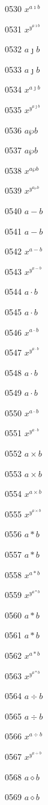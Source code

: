 \documentclass{article}
\begin{document}
0530 $x^{a\imath b}$\par
0531 $x^{y^{a\imath b}}$\par
0532 $a\jmath b$\par
0533 $\displaystyle a\jmath b$\par
0534 $x^{a\jmath b}$\par
0535 $x^{y^{a\jmath b}}$\par
0536 $a\wp b$\par
0537 $\displaystyle a\wp b$\par
0538 $x^{a\wp b}$\par
0539 $x^{y^{a\wp b}}$\par
0540 $a-b$\par
0541 $\displaystyle a-b$\par
0542 $x^{a-b}$\par
0543 $x^{y^{a-b}}$\par
0544 $a\cdot b$\par
0545 $\displaystyle a\cdot b$\par
0546 $x^{a\cdot b}$\par
0547 $x^{y^{a\cdot b}}$\par
0548 $a\cdotp b$\par
0549 $\displaystyle a\cdotp b$\par
0550 $x^{a\cdotp b}$\par
0551 $x^{y^{a\cdotp b}}$\par
0552 $a\times b$\par
0553 $\displaystyle a\times b$\par
0554 $x^{a\times b}$\par
0555 $x^{y^{a\times b}}$\par
0556 $a*b$\par
0557 $\displaystyle a*b$\par
0558 $x^{a*b}$\par
0559 $x^{y^{a*b}}$\par
0560 $a\ast b$\par
0561 $\displaystyle a\ast b$\par
0562 $x^{a\ast b}$\par
0563 $x^{y^{a\ast b}}$\par
0564 $a\div b$\par
0565 $\displaystyle a\div b$\par
0566 $x^{a\div b}$\par
0567 $x^{y^{a\div b}}$\par
0568 $a\diamond b$\par
0569 $\displaystyle a\diamond b$\par
\end{document}
